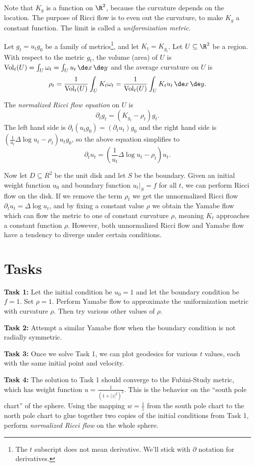 \documentclass{article}
\begin{document}
Note that $K_g$ is a function on $\R^2$, because the curvature depends on the location.  The purpose of Ricci flow is to even out the curvature, to make $K_g$ a constant function.  The limit is called a \emph{uniformization metric}.

Let $g_t=u_tg_0$ be a family of metrics\footnote{The $t$ subscript does not mean derivative.  We'll stick with $\partial$ notation for derivatives.}, and let $K_t=K_{g_t}$.  Let $U\subseteq\R^2$ be a region.  With respect to the metric $g_t$, the volume (area) of $U$ is $\mathrm{Vol}_t(U)=\int_U \omega_t=\int_U u_t\,\de x\,\de y$ and the average curvature on $U$ is
    $$\rho_t=\frac1{\mathrm{Vol}_t(U)}\int_U K_t\omega_t=\frac1{\mathrm{Vol}_t(U)}\int_U K_tu_t\,\de x\,\de y.$$

The \emph{normalized Ricci flow equation} on $U$ is
\begin{equation}
    \partial_tg_t=(K_{g_t}-\rho_t)g_t.
\end{equation}
The left hand side is $\partial_t(u_tg_0)=(\partial_t u_t)g_0$ and the right hand side is $(\frac1{u_t}\Delta\log u_t-\rho_t)u_tg_0$, so the above equation simplifies to
\begin{equation}
    \partial_tu_t=\left(\frac1{u_t}\Delta\log u_t-\rho_t\right)u_t.
\end{equation}

Now let $D\subseteq R^2$ be the unit disk and let $S$ be the boundary.  Given an initial weight function $u_0$ and boundary function $u_t\big|_S=f$ for all $t$, we can perform Ricci flow on the disk.  If we remove the term $\rho_t$ we get the unnormalized Ricci flow $\partial_tu_t=\Delta\log u_t$, and by fixing a constant value $\rho$ we obtain the Yamabe flow which can flow the metric to one of constant curvature $\rho$, meaning $K_t$ approaches a constant function $\rho$.  However, both unnormalized Ricci flow and Yamabe flow have a tendency to diverge under certain conditions.


\section*{Tasks}
\noindent
\textbf{Task 1:}
Let the initial condition be $u_0=1$ and let the boundary condition be $f=1$.  Set $\rho=1$.  Perform Yamabe flow to approximate the uniformization metric with curvature $\rho$.  Then try various other values of $\rho$.

\noindent
\textbf{Task 2:}
Attempt a similar Yamabe flow when the boundary condition is not radially symmetric.

\noindent
\textbf{Task 3:}
Once we solve Task 1, we can plot geodesics for various $t$ values, each with the same initial point and velocity.

\noindent
\textbf{Task 4:}
The solution to Task 1 should converge to the Fubini-Study metric, which has weight function $u=\frac1{(1+|z|^2)^2}$.  This is the behavior on the ``south pole chart'' of the sphere.  Using the mapping $w=\frac1z$ from the south pole chart to the north pole chart to glue together two copies of the initial conditions from Task 1, perform \emph{normalized Ricci flow} on the whole sphere.
\end{document}
